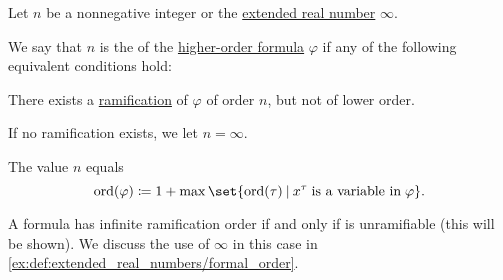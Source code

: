 \begin{definition}\label{def:hol_formula_ramification_order}\mimprovised
  Let \( n \) be a nonnegative integer or the \hyperref[def:extended_real_numbers]{extended real number} \( \infty \).

  We say that \( n \) is the  of the \hyperref[def:hol_term/formula]{higher-order formula} \( \varphi \) if any of the following equivalent conditions hold:
  \begin{thmenum}
     There exists a \hyperref[def:ramified_theory_of_types/formula]{ramification} of \( \varphi \) of order \( n \), but not of lower order.

    If no ramification exists, we let \( n = \infty \).

     The value \( n \) equals
    \begin{equation}\label{eq:def:hol_formula_ramification_order/direct}
      \ord(\varphi) \coloneqq 1 + \max\set{ \ord(\tau) \given x^\tau \T{is a variable in} \varphi }.
    \end{equation}
  \end{thmenum}
\end{definition}
\begin{comments}
  \item A formula has infinite ramification order if and only if is unramifiable (this will be shown). We discuss the use of \( \infty \) in this case in \cref{ex:def:extended_real_numbers/formal_order}.
\end{comments}
